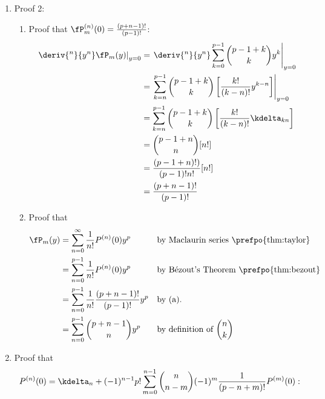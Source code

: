 \begin{enumerate}

\item Proof 2:
\begin{enumerate}
\item Proof that $\fP_m^{(n)}(0)=\frac{(p+n-1)!}{(p-1)!}$:\\
  \begin{align*}
  \left.\deriv{^n}{y^n} \fP_m(y) \right|_{y=0}
    &= \left.
       \deriv{^n}{y^n}
       \sum_{k=0}^{p-1} {p-1+k\choose k} y^k
       \right|_{y=0}
  \\&= \left.
       \sum_{k=n}^{p-1} {p-1+k\choose k} \left[\frac{k!}{(k-n)!}y^{k-n}\right]
       \right|_{y=0}
  \\&= \sum_{k=n}^{p-1} {p-1+k\choose k} \left[\frac{k!}{(k-n)!} \kdelta_{kn}\right]
  \\&= {p-1+n\choose n} [n!]
  \\&= \frac{(p-1+n)!)}{(p-1)!n!} [n!]
  \\&= \frac{(p+n-1)!}{(p-1)!}
  \end{align*}


\item Proof that
\begin{align*}
  \fP_m(y)
    &= \sum_{n=0}^\infty \frac{1}{n!} P^{(n)}(0) y^p
    && \text{by Maclaurin series \prefpo{thm:taylor}}
  \\&= \sum_{n=0}^{p-1} \frac{1}{n!} P^{(n)}(0) y^p
    && \text{by B\'ezout's Theorem \prefpo{thm:bezout}}
  \\&= \sum_{n=0}^{p-1} \frac{1}{n!} \frac{(p+n-1)!}{(p-1)!}  y^p
    && \text{by (a).}
  \\&= \sum_{n=0}^{p-1} {p+n-1 \choose n}  y^p
    && \text{by definition of ${n\choose k}$}
\end{align*}
\end{enumerate}


\item Proof that
  \[
    P^{(n)}(0) =  \kdelta_n +
    (-1)^{n-1} p!
    \sum_{m=0}^{n-1} {n\choose n-m} (-1)^m \frac{1}{(p-n+m)!}
    P^{(m)}(0):
  \]


\end{enumerate}
